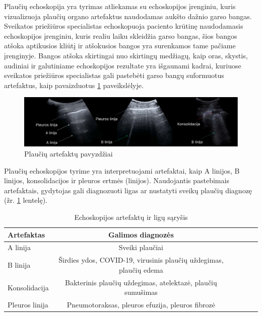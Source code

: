 \documentclass[
]{VUMIFPSbakalaurinis}
\begin{document}
Plaučių echoskopija yra tyrimas atliekamas su echoskopijos įrenginiu, kuris vizualizuoja plaučių organo artefaktus naudodamas aukšto dažnio garso bangas. Sveikatos priežiūros specialistas echoskopuoja paciento krūtinę naudodamasis echoskopijos įrenginiu, kuris realiu laiku skleidžia garso bangas, šios bangos atšoka aptikusios kliūtį ir atšokusios bangos yra surenkamos tame pačiame įrenginyje. Bangos atšoka skirtingai nuo skirtingų medžiagų, kaip oras, skystis, audiniai ir galutiniame echoskopijos rezultate yra išgaunami kadrai, kuriuose sveikatos priežiūros specialistas gali pastebėti garso bangų suformuotus artefaktus, kaip pavaizduotus \ref{img:plauciai_art} paveikslėlyje.
\begin{figure}[H]
    \centering
    \includegraphics[scale=0.391]{img/plauciai_artefaktai.png}
    \caption{Plaučių artefaktų pavyzdžiai \cite{demi2023new}}
    \label{img:plauciai_art}
\end{figure}
Plaučių echoskopijos tyrime yra interpretuojami artefaktai, kaip A linijos, B linijos, konsolidacijos ir pleuros ertmės (linijos). Naudojantis pastebimais artefaktais, gydytojas gali diagnozuoti ligas ar nustatyti sveikų plaučių diagnozę (žr. \ref{tab:ligos} lentelę). 
\begin{table}[H]\footnotesize
  \centering
  \caption{Echoskopijos artefaktų ir ligų sąryšis \cite{demi2023new, cammarota2023lung}}
  \begin{tabular}{|l|c|c|c|c|c|} \hline
     Artefaktas & Galimos diagnozės \\
    \hline
    A linija  & Sveiki plaučiai \\
    B linija & Širdies ydos, COVID-19, virusinis plaučių uždegimas, plaučių edema \\
    Konsolidacija & Bakterinis plaučių uždegimas, atelektazė, plaučių sumušimas \\
    Pleuros linija & Pneumotoraksas, pleuros efuzija, pleuros fibrozė \\
    \hline
  \end{tabular}
  \label{tab:ligos}
\end{table}
\par
\end{document}
